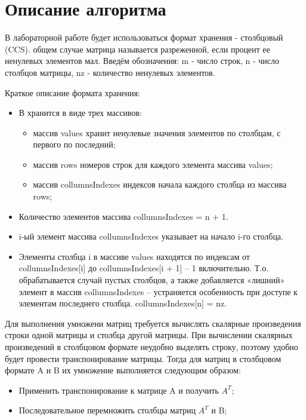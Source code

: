\documentclass{report}
\begin{document}
\section*{Описание алгоритма}
\par В лабораторной работе будет использоваться формат хранения - столбцовый (CCS). общем случае матрица называется разреженной, если  процент ее ненулевых элементов мал. Введём обозначения: m - число строк, n - число столбцов матрицы, nz - количество ненулевых элементов.
\par Краткое описание формата хранения:
\begin{itemize}
	\item В хранится в виде трех массивов:
	\begin{itemize}
		\item массив values хранит ненулевые значения элементов по столбцам, с первого по последний;
		\item массив rows номеров строк для каждого элемента массива values;
		\item массив collumnsIndexes индексов начала каждого столбца из массива rows;
	\end{itemize}
	\item Количество элементов массива collumnsIndexes = n + 1.
	\item i-ый элемент массива collumnsIndexes указывает на начало i-го столбца.
	\item Элементы столбца i в массиве values находятся по индексам от collumnsIndexes[i] до collumnsIndexes[i + 1] – 1 включительно. Т.о. обрабатывается случай пустых столбцов, а также добавляется «лишний» элемент в массив collumnsIndexes – устраняется особенность при доступе к элементам последнего столбца. collumnsIndexes[n] = nz.
\end{itemize}
\par Для выполнения умножени матриц требуется вычислять скалярные произведения строки одной матрицы и столбца другой матрицы. При вычислении скалярных произведений в столбцовом формате неудобно выделять строку, поэтому удобно будет провести транспонирование матрицы. Тогда для матриц в столбцовом формате A и B их умножение выполняется следующим образом:
\begin{itemize}
	\item Применить транспонирование к матрице A и получить $A^{T}$;
	\item Последовательное перемножить столбцы матриц $A^{T}$ и B;
\end{itemize}
\end{document}
